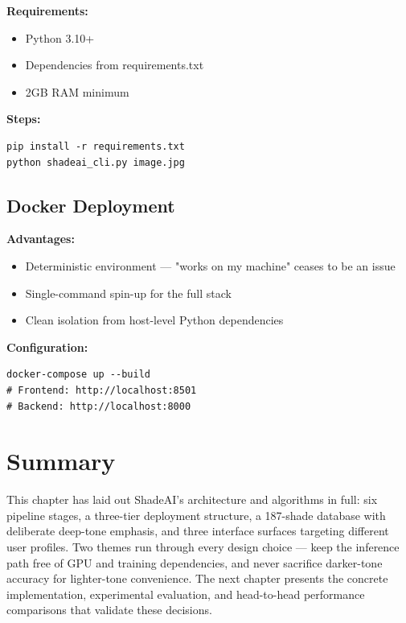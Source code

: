 \textbf{Requirements:}
\begin{itemize}
    \item Python 3.10+
    \item Dependencies from requirements.txt
    \item 2GB RAM minimum
\end{itemize}

\textbf{Steps:}
\begin{verbatim}
pip install -r requirements.txt
python shadeai_cli.py image.jpg
\end{verbatim}

\subsection{Docker Deployment}

\textbf{Advantages:}
\begin{itemize}
    \item Deterministic environment — "works on my machine" ceases to be an issue
    \item Single-command spin-up for the full stack
    \item Clean isolation from host-level Python dependencies
\end{itemize}

\textbf{Configuration:}
\begin{verbatim}
docker-compose up --build
# Frontend: http://localhost:8501
# Backend: http://localhost:8000
\end{verbatim}

\section{Summary}

This chapter has laid out ShadeAI's architecture and algorithms in full: six pipeline stages, a three-tier deployment structure, a 187-shade database with deliberate deep-tone emphasis, and three interface surfaces targeting different user profiles. Two themes run through every design choice — keep the inference path free of GPU and training dependencies, and never sacrifice darker-tone accuracy for lighter-tone convenience. The next chapter presents the concrete implementation, experimental evaluation, and head-to-head performance comparisons that validate these decisions.
